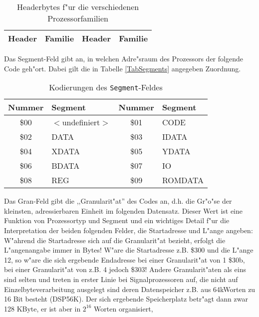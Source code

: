 \documentclass[12pt,a4paper,twoside]{report}
\begin{document}
{\begin{table*}[htbp]
\begin{center}\begin{tabular}{|c|l||c|l|}
\hline
Header & Familie & Header & Familie \\
\hline
\hline

\end{tabular}\end{center}
\caption{Headerbytes f"ur die verschiedenen Prozessorfamilien\label{TabHeader2}}
\end{table*}

Das Segment-Feld gibt an, in welchen Adre"sraum des Prozessors der 
folgende Code geh"ort.  Dabei gilt die in Tabelle \ref{TabSegments}
angegeben Zuordnung.
\begin{table*}[htbp]
\begin{center}\begin{tabular}{|c|l||c|l|}
\hline
Nummer & Segment & Nummer & Segment \\
\hline
\hline
\$00 &    $<$undefiniert$>$    & \$01 &    CODE \\
\$02 &    DATA                 & \$03 &    IDATA \\
\$04 &    XDATA                & \$05 &    YDATA \\
\$06 &    BDATA                & \$07 &    IO \\
\$08 &    REG                  & \$09 &    ROMDATA \\
\hline
\end{tabular}\end{center}
\caption{Kodierungen des {\tt Segment}-Feldes\label{TabSegments}
         \label{TabSegmentNums}}
\end{table*}
Das Gran-Feld gibt die ,,Granularit"at'' des Codes an, d.h. die Gr"o"se 
der kleinsten, adressierbaren Einheit im folgenden Datensatz.  Dieser
Wert ist eine Funktion von Prozessortyp und Segment und ein wichtiges
Detail f"ur die Interpretation der beiden folgenden Felder, die 
Startadresse und L"ange angeben: W"ahrend die Startadresse sich auf die 
Granularit"at bezieht, erfolgt die L"angenangabe immer in Bytes!  W"are
die Startadresse z.B. \$300 und die L"ange 12, so w"are die sich
ergebende Endadresse bei einer Granularit"at von 1 \$30b, bei einer
Granularit"at von z.B. 4 jedoch \$303!  Andere Granularit"aten als eins
sind selten und treten in erster Linie bei Signalprozessoren auf, die
nicht  auf Einzelbyteverarbeitung ausgelegt sind deren Datenspeicher z.B.
aus 64kWorten zu 16 Bit besteht (DSP56K).  Der sich ergebende Speicherplatz
betr"agt dann zwar 128 KByte, er ist aber in $2^{16}$ Worten organisiert,
}
\end{document}
